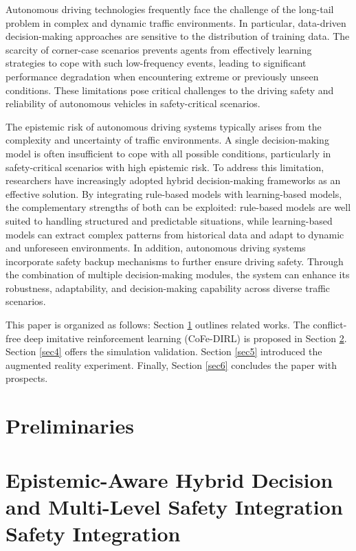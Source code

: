 \documentclass[preprint,12pt,authoryear]{elsarticle}
\begin{document}
Autonomous driving technologies frequently face the challenge of the long-tail problem in complex and dynamic traffic environments. In particular, data-driven decision-making approaches are sensitive to the distribution of training data. The scarcity of corner-case scenarios prevents agents from effectively learning strategies to cope with such low-frequency events, leading to significant performance degradation when encountering extreme or previously unseen conditions. These limitations pose critical challenges to the driving safety and reliability of autonomous vehicles in safety-critical scenarios.

The epistemic risk of autonomous driving systems typically arises from the complexity and uncertainty of traffic environments. A single decision-making model is often insufficient to cope with all possible conditions, particularly in safety-critical scenarios with high epistemic risk. To address this limitation, researchers have increasingly adopted hybrid decision-making frameworks as an effective solution. By integrating rule-based models with learning-based models, the complementary strengths of both can be exploited: rule-based models are well suited to handling structured and predictable situations, while learning-based models can extract complex patterns from historical data and adapt to dynamic and unforeseen environments. In addition, autonomous driving systems incorporate safety backup mechanisms to further ensure driving safety. Through the combination of multiple decision-making modules, the system can enhance its robustness, adaptability, and decision-making capability across diverse traffic scenarios.

This paper is organized as follows: Section \ref{sec2} outlines related works. The conflict-free deep imitative reinforcement learning (CoFe-DIRL) is proposed in Section \ref{sec3}. 
Section \ref{sec4} offers the simulation validation. 
Section \ref{sec5} introduced the augmented reality experiment. 
Finally, Section \ref{sec6} concludes the paper with prospects. 

\section{Preliminaries}
\label{sec2}

\section{Epistemic-Aware Hybrid Decision and Multi-Level Safety Integration Safety Integration}
\label{sec3}
\end{document}
